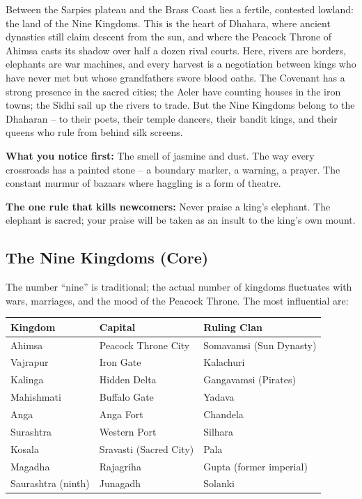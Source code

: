 \documentclass[11pt]{book}
\begin{document}
\begin{tcolorbox}[colback=black!3,colframe=blue!60!black,title={Theme \& Atmosphere (Nine Kingdoms)}]
Between the Sarpies plateau and the Brass Coast lies a fertile, contested lowland: the land of the Nine Kingdoms. This is the heart of Dhahara, where ancient dynasties still claim descent from the sun, and where the Peacock Throne of Ahimsa casts its shadow over half a dozen rival courts. Here, rivers are borders, elephants are war machines, and every harvest is a negotiation between kings who have never met but whose grandfathers swore blood oaths. The Covenant has a strong presence in the sacred cities; the Aeler have counting houses in the iron towns; the Sidhi sail up the rivers to trade. But the Nine Kingdoms belong to the Dhaharan – to their poets, their temple dancers, their bandit kings, and their queens who rule from behind silk screens.

\vspace{2mm}
\textbf{What you notice first:} The smell of jasmine and dust. The way every crossroads has a painted stone – a boundary marker, a warning, a prayer. The constant murmur of bazaars where haggling is a form of theatre.

\textbf{The one rule that kills newcomers:} Never praise a king's elephant. The elephant is sacred; your praise will be taken as an insult to the king's own mount.
\end{tcolorbox}

\subsection*{The Nine Kingdoms (Core)}
The number “nine” is traditional; the actual number of kingdoms fluctuates with wars, marriages, and the mood of the Peacock Throne. The most influential are:

\begin{center}
\begin{tabular}{|l|l|l|}
\hline
\textbf{Kingdom} & \textbf{Capital} & \textbf{Ruling Clan} \\
\hline
Ahimsa & Peacock Throne City & Somavamsi (Sun Dynasty) \\
Vajrapur & Iron Gate & Kalachuri \\
Kalinga & Hidden Delta & Gangavamsi (Pirates) \\
Mahishmati & Buffalo Gate & Yadava \\
Anga & Anga Fort & Chandela \\
Surashtra & Western Port & Silhara \\
Kosala & Sravasti (Sacred City) & Pala \\
Magadha & Rajagriha & Gupta (former imperial) \\
Saurashtra (ninth) & Junagadh & Solanki \\
\hline
\end{tabular}
\end{center}
\end{document}
